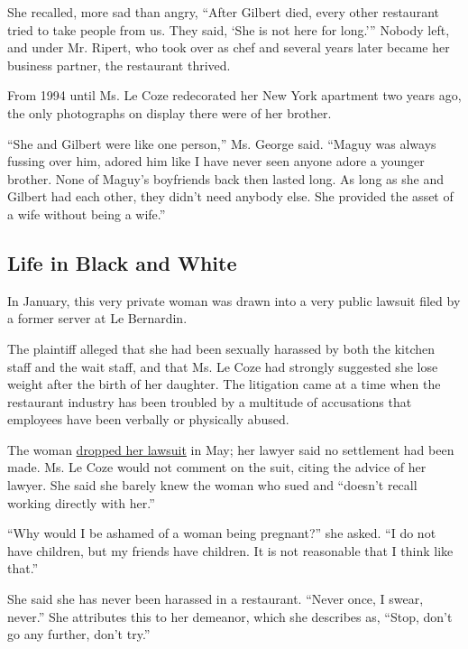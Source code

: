 She recalled, more sad than angry, ``After Gilbert died, every other
restaurant tried to take people from us. They said, `She is not here for
long.''' Nobody left, and under Mr. Ripert, who took over as chef and
several years later became her business partner, the restaurant thrived.

From 1994 until Ms. Le Coze redecorated her New York apartment two years
ago, the only photographs on display there were of her brother.

``She and Gilbert were like one person,'' Ms. George said. ``Maguy was
always fussing over him, adored him like I have never seen anyone adore
a younger brother. None of Maguy's boyfriends back then lasted long. As
long as she and Gilbert had each other, they didn't need anybody else.
She provided the asset of a wife without being a wife.''

\hypertarget{life-in-black-and-white}{%
\subsection{Life in Black and White}\label{life-in-black-and-white}}

In January, this very private woman was drawn into a very public lawsuit
filed by a former server at Le Bernardin.

The plaintiff alleged that she had been sexually harassed by both the
kitchen staff and the wait staff, and that Ms. Le Coze had strongly
suggested she lose weight after the birth of her daughter. The
litigation came at a time when the restaurant industry has been troubled
by a multitude of accusations that employees have been verbally or
physically abused.

The woman
\href{https://www.reuters.com/article/us-new-york-le-bernardin/former-le-bernardin-server-ends-lawsuit-against-new-york-restaurant-idUSKCN1IJ1X5}{dropped
her lawsuit} in May; her lawyer said no settlement had been made. Ms. Le
Coze would not comment on the suit, citing the advice of her lawyer. She
said she barely knew the woman who sued and ``doesn't recall working
directly with her.''

``Why would I be ashamed of a woman being pregnant?'' she asked. ``I do
not have children, but my friends have children. It is not reasonable
that I think like that.''

She said she has never been harassed in a restaurant. ``Never once, I
swear, never.'' She attributes this to her demeanor, which she describes
as, ``Stop, don't go any further, don't try.''

